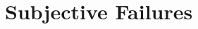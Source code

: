 \documentclass[11pt]{article}
\begin{document}
\section{Subjective Failures}
\label{sec:subjective}

\printbibliography





\end{document}
